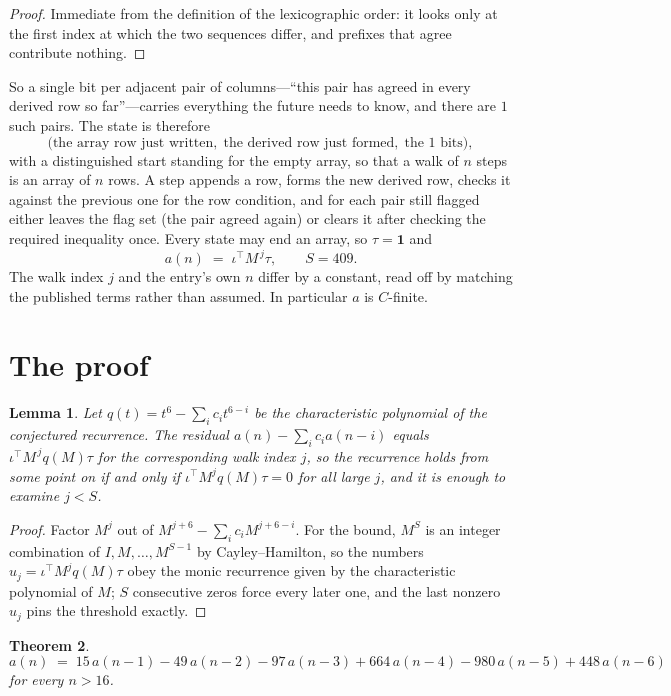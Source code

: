 \documentclass[11pt,a4paper]{article}
\theoremstyle{plain}
\newtheorem{theorem}{Theorem}
\newtheorem{lemma}[theorem]{Lemma}
\theoremstyle{definition}
\begin{document}
\begin{proof}
Immediate from the definition of the lexicographic order: it looks only at the first index at
which the two sequences differ, and prefixes that agree contribute nothing.
\end{proof}

So a single bit per adjacent pair of columns---``this pair has agreed in every derived row so
far''---carries everything the future needs to know, and there are $1$ such pairs. The state
is therefore
\[
\bigl(\text{the array row just written},\; \text{the derived row just formed},\;
\text{the 1 bits}\bigr),
\]
with a distinguished start standing for the empty array, so that a walk of $n$ steps is an array
of $n$ rows. A step appends a row, forms the new derived row, checks it against the previous one
for the row condition, and for each pair still flagged either leaves the flag set (the pair
agreed again) or clears it after checking the required inequality once. Every state may end an
array, so $\tau=\mathbf{1}$ and
\[
a(n)\;=\;\iota^{\!\top}M^{\,j}\tau ,\qquad S=409.
\]
The walk index $j$ and the entry's own $n$ differ by a constant, read off by matching the
published terms rather than assumed. In particular $a$ is $C$-finite.

\section{The proof}

\begin{lemma}\label{lem:crit}
Let $q(t)=t^{6}-\sum_i c_it^{6-i}$ be the characteristic polynomial of the
conjectured recurrence. The residual $a(n)-\sum_ic_ia(n-i)$ equals
$\iota^{\!\top}M^{\,j}q(M)\tau$ for the corresponding walk index $j$, so the recurrence
holds from some point on if and only if $\iota^{\!\top}M^{j}q(M)\tau=0$ for all large $j$,
and it is enough to examine $j<S$.
\end{lemma}

\begin{proof}
Factor $M^{j}$ out of $M^{j+6}-\sum_ic_iM^{j+6-i}$. For the bound, $M^{S}$
is an integer combination of $I,M,\dots,M^{S-1}$ by Cayley--Hamilton, so the numbers
$u_j=\iota^{\!\top}M^{j}q(M)\tau$ obey the monic recurrence given by the characteristic
polynomial of $M$; $S$ consecutive zeros force every later one, and the last nonzero $u_j$
pins the threshold exactly.
\end{proof}

\begin{theorem}
\[
a(n)\;=\;15\,a(n-1) - 49\,a(n-2) - 97\,a(n-3) + 664\,a(n-4) - 980\,a(n-5) + 448\,a(n-6)
\]
for every $n>16$.
\end{theorem}
\end{document}
